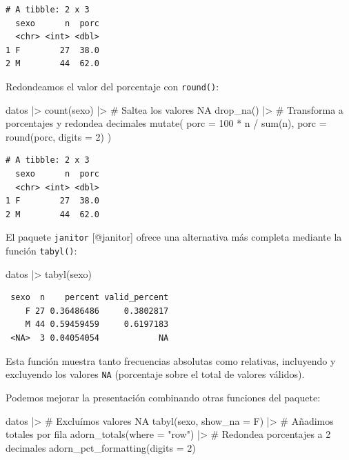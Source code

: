 \documentclass[
  spanish,
  letterpaper,
  DIV=11,
  numbers=noendperiod]{scrreprt}
\newenvironment{Shaded}{\begin{snugshade}}{\end{snugshade}}
\newcommand{\AttributeTok}[1]{\textcolor[rgb]{0.40,0.45,0.13}{#1}}
\newcommand{\CommentTok}[1]{\textcolor[rgb]{0.37,0.37,0.37}{#1}}
\newcommand{\DecValTok}[1]{\textcolor[rgb]{0.68,0.00,0.00}{#1}}
\newcommand{\FunctionTok}[1]{\textcolor[rgb]{0.28,0.35,0.67}{#1}}
\newcommand{\NormalTok}[1]{\textcolor[rgb]{0.00,0.23,0.31}{#1}}
\newcommand{\SpecialCharTok}[1]{\textcolor[rgb]{0.37,0.37,0.37}{#1}}
\newcommand{\StringTok}[1]{\textcolor[rgb]{0.13,0.47,0.30}{#1}}
\begin{document}
\begin{verbatim}
# A tibble: 2 x 3
  sexo      n  porc
  <chr> <int> <dbl>
1 F        27  38.0
2 M        44  62.0
\end{verbatim}

Redondeamos el valor del porcentaje con \texttt{round()}:

\begin{Shaded}
\begin{Highlighting}[]
\NormalTok{datos }\SpecialCharTok{|\textgreater{}}
  \FunctionTok{count}\NormalTok{(sexo) }\SpecialCharTok{|\textgreater{}}
  \CommentTok{\# Saltea los valores NA}
  \FunctionTok{drop\_na}\NormalTok{() }\SpecialCharTok{|\textgreater{}}
  \CommentTok{\# Transforma a porcentajes y redondea decimales}
  \FunctionTok{mutate}\NormalTok{(}
    \AttributeTok{porc =} \DecValTok{100} \SpecialCharTok{*}\NormalTok{ n }\SpecialCharTok{/} \FunctionTok{sum}\NormalTok{(n),}
    \AttributeTok{porc =} \FunctionTok{round}\NormalTok{(porc, }\AttributeTok{digits =} \DecValTok{2}\NormalTok{)}
\NormalTok{  )}
\end{Highlighting}
\end{Shaded}

\begin{verbatim}
# A tibble: 2 x 3
  sexo      n  porc
  <chr> <int> <dbl>
1 F        27  38.0
2 M        44  62.0
\end{verbatim}

El paquete \texttt{janitor} {[}@janitor{]} ofrece una alternativa más
completa mediante la función \texttt{tabyl()}:

\begin{Shaded}
\begin{Highlighting}[]
\NormalTok{datos }\SpecialCharTok{|\textgreater{}}
  \FunctionTok{tabyl}\NormalTok{(sexo)}
\end{Highlighting}
\end{Shaded}

\begin{verbatim}
 sexo  n    percent valid_percent
    F 27 0.36486486     0.3802817
    M 44 0.59459459     0.6197183
 <NA>  3 0.04054054            NA
\end{verbatim}

Esta función muestra tanto frecuencias absolutas como relativas,
incluyendo y excluyendo los valores \texttt{NA} (porcentaje sobre el
total de valores válidos).

Podemos mejorar la presentación combinando otras funciones del paquete:

\begin{Shaded}
\begin{Highlighting}[]
\NormalTok{datos }\SpecialCharTok{|\textgreater{}}
  \CommentTok{\# Excluímos valores NA}
  \FunctionTok{tabyl}\NormalTok{(sexo, }\AttributeTok{show\_na =}\NormalTok{ F) }\SpecialCharTok{|\textgreater{}}
  \CommentTok{\# Añadimos totales por fila}
  \FunctionTok{adorn\_totals}\NormalTok{(}\AttributeTok{where =} \StringTok{"row"}\NormalTok{) }\SpecialCharTok{|\textgreater{}}
  \CommentTok{\# Redondea porcentajes a 2 decimales}
  \FunctionTok{adorn\_pct\_formatting}\NormalTok{(}\AttributeTok{digits =} \DecValTok{2}\NormalTok{)}
\end{Highlighting}
\end{Shaded}
\end{document}
